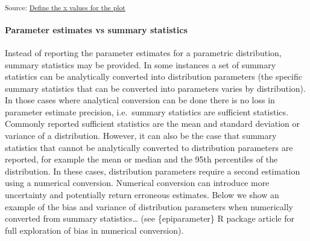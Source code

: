 \documentclass[
  10pt,
  letterpaper,
]{article}
\begin{document}
\begin{figure}[H]
{

\subcaption{\label{fig-dist-params-2}}

}

\caption{\label{fig-dist-params}}

\end{figure}%

\textsubscript{Source:
\href{https://joshwlambert.github.io/epiparameterReportingGuidance/use_cases/dist_params.embed-preview.html\#cell-fig-dist-params}{Define
the x values for the plot}}

\paragraph{Parameter estimates vs summary
statistics}\label{parameter-estimates-vs-summary-statistics}

Instead of reporting the parameter estimates for a parametric
distribution, summary statistics may be provided. In some instances a
set of summary statistics can be analytically converted into
distribution parameters (the specific summary statistics that can be
converted into parameters varies by distribution). In those cases where
analytical conversion can be done there is no loss in parameter estimate
precision, i.e.~summary statistics are sufficient statistics. Commonly
reported sufficient statistics are the mean and standard deviation or
variance of a distribution. However, it can also be the case that
summary statistics that cannot be analytically converted to distribution
parameters are reported, for example the mean or median and the 95th
percentiles of the distribution. In these cases, distribution parameters
require a second estimation using a numerical conversion. Numerical
conversion can introduce more uncertainty and potentially return
erroneous estimates. Below we show an example of the bias and variance
of distribution parameters when numerically converted from summary
statistics\ldots{} (see \{epiparameter\} R package article for full
exploration of bias in numerical conversion).
\end{document}
